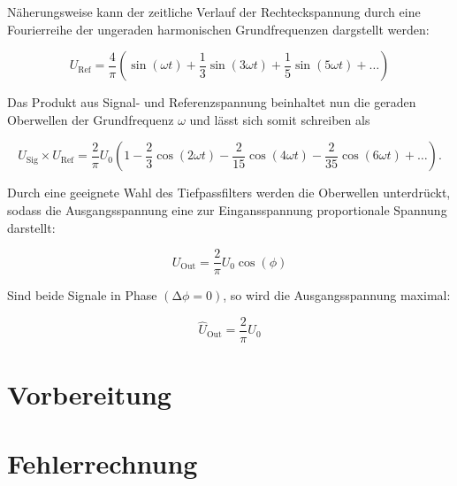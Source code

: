 \noindent Näherungsweise kann der zeitliche Verlauf der Rechteckspannung durch eine Fourierreihe der ungeraden harmonischen
Grundfrequenzen dargstellt werden:

\begin{equation*}
    U_\text{Ref} = \frac{4}{\pi}\left(\sin(\omega t) + \frac{1}{3}\sin(3\omega t) + \frac{1}{5}\sin(5\omega t) + \dotsc\right)
\end{equation*}

\noindent Das Produkt aus Signal- und Referenzspannung beinhaltet nun die geraden Oberwellen der Grundfrequenz $\omega$ und lässt
sich somit schreiben als

\begin{equation*}
    U_\text{Sig} \times U_\text{Ref} = \frac{2}{\pi}U_0\left(1 - \frac{2}{3}\cos(2\omega t) - \frac{2}{15}\cos(4\omega t) - \frac{2}{35}\cos(6\omega t) + \dotsc\right).
\end{equation*}

\noindent Durch eine geeignete Wahl des Tiefpassfilters werden die Oberwellen unterdrückt, sodass die Ausgangsspannung eine zur Eingansspannung
proportionale Spannung darstellt:

\begin{equation*}
    U_\text{Out} = \frac{2}{\pi}U_0\cos(\phi)
\end{equation*}

\noindent Sind beide Signale in Phase $\left(\increment \phi = 0\right)$, so wird die Ausgangsspannung maximal:

\begin{equation*}
    \hat{U}_\text{Out} = \frac{2}{\pi}U_0
\end{equation*}

\section{Vorbereitung}

\section{Fehlerrechnung}

